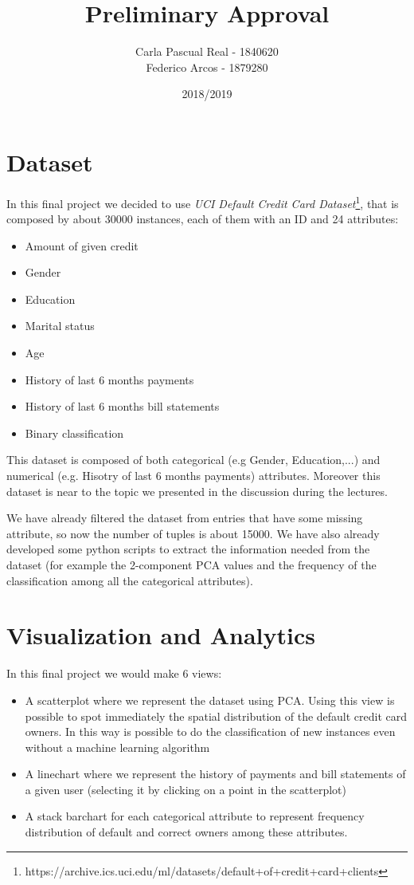 \documentclass{article}
\title{Preliminary Approval}
\author{Carla Pascual Real - 1840620\\
Federico Arcos - 1879280}
\date{2018/2019}
\begin{document}
\maketitle
\section{Dataset}

In this final project we decided to use \textit{UCI Default Credit Card Dataset}\footnote{https://archive.ics.uci.edu/ml/datasets/default+of+credit+card+clients}, that is composed by about 30000 instances, each of them with an ID and 24 attributes:
\begin{itemize}
  \item Amount of given credit
  \item Gender
  \item Education
  \item Marital status
  \item Age
  \item History of last 6 months payments
  \item History of last 6 months bill statements
  \item Binary classification
\end{itemize}

This dataset is composed of both categorical (e.g Gender, Education,...) and numerical (e.g. Hisotry of last 6 months payments) attributes. Moreover this dataset is near to the topic we presented in the discussion during the lectures.

We have already filtered the dataset from entries that have some missing attribute, so now the number of tuples is about 15000. We have also already developed some python scripts to extract the information needed from the dataset (for example the 2-component PCA
values and the frequency of the classification among all the categorical attributes).

\section{Visualization and Analytics}

In this final project we would make 6 views:
\begin{itemize}
  \item A scatterplot where we represent the dataset using PCA. Using this view is possible to spot immediately the spatial distribution of the default credit card owners. In this way is possible to do the classification of new instances even without a machine learning algorithm
  \item A linechart where we represent the history of payments and bill statements of a given user (selecting it by clicking on a point in the scatterplot)
  \item A stack barchart for each categorical attribute to represent frequency distribution of default and correct owners among these attributes.
\end{itemize}
\end{document}
